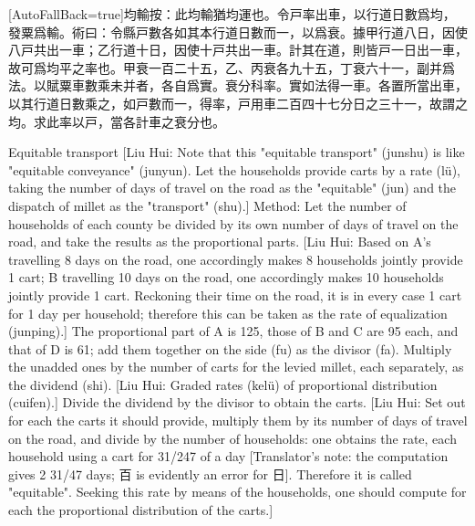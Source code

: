 \documentclass[11pt]{article}
\newcommand{\zhsmall}{\footnotesize\color{black!70}}
\newcommand{\unitlabel}[1]{\marginpar{\raggedleft\tiny\color{gray}#1}}
\newenvironment{unitzh}{\par\CJKfontspec{Noto Serif CJK SC}[AutoFallBack=true]\large\linespread{1.25}\selectfont}{\par}
\newenvironment{uniten}{\par\small\color{black!85}}{\par\medskip}
\begin{document}
\begin{unitzh}\unitlabel{jiuzhang-023.4}均輸{\zhsmall 按：此均輸猶均運也。令戸率出車，以行道日數爲均，發粟爲輸。}術曰：令縣戸數各如其本行道日數而一，以爲衰。{\zhsmall 據甲行道八日，因使八戸共出一車；乙行道十日，因使十戸共出一車。計其在道，則皆戸一日出一車，故可爲均平之率也。}甲衰一百二十五，乙、丙衰各九十五，丁衰六十一，副并爲法。以賦粟車數乘未并者，各自爲實。{\zhsmall 衰分科率。}實如法得一車。{\zhsmall 各置所當出車，以其行道日數乘之，如戸數而一，得率，戸用車二百四十七分日之三十一，故謂之均。求此率以戸，當各計車之衰分也。}\end{unitzh}
\begin{uniten}Equitable transport [Liu Hui: Note that this "equitable transport" (junshu) is like "equitable conveyance" (junyun). Let the households provide carts by a rate (lü), taking the number of days of travel on the road as the "equitable" (jun) and the dispatch of millet as the "transport" (shu).] Method: Let the number of households of each county be divided by its own number of days of travel on the road, and take the results as the proportional parts. [Liu Hui: Based on A's travelling 8 days on the road, one accordingly makes 8 households jointly provide 1 cart; B travelling 10 days on the road, one accordingly makes 10 households jointly provide 1 cart. Reckoning their time on the road, it is in every case 1 cart for 1 day per household; therefore this can be taken as the rate of equalization (junping).] The proportional part of A is 125, those of B and C are 95 each, and that of D is 61; add them together on the side (fu) as the divisor (fa). Multiply the unadded ones by the number of carts for the levied millet, each separately, as the dividend (shi). [Liu Hui: Graded rates (kelü) of proportional distribution (cuifen).] Divide the dividend by the divisor to obtain the carts. [Liu Hui: Set out for each the carts it should provide, multiply them by its number of days of travel on the road, and divide by the number of households: one obtains the rate, each household using a cart for 31/247 of a day [Translator's note: the computation gives 2 31/47 days; 百 is evidently an error for 日]. Therefore it is called "equitable". Seeking this rate by means of the households, one should compute for each the proportional distribution of the carts.]\end{uniten}
\end{document}
